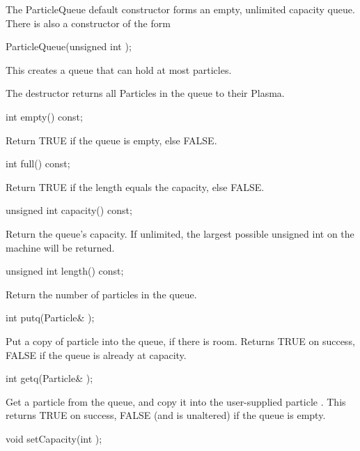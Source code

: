 The ParticleQueue default constructor forms an empty, unlimited capacity
queue.  There is also a constructor of the form

\begin{example}
ParticleQueue(unsigned int );
\end{example}

This creates a queue that can hold at most  particles.

The destructor returns all Particles in the queue to their Plasma.

\begin{example}
int empty() const;
\end{example}

Return TRUE if the queue is empty, else FALSE.

\begin{example}
int full() const;
\end{example}

Return TRUE if the length equals the capacity, else FALSE.

\begin{example}
unsigned int capacity() const;
\end{example}

Return the queue's capacity.  If unlimited, the largest possible
unsigned int on the machine will be returned.

\begin{example}
unsigned int length() const;
\end{example}

Return the number of particles in the queue.

\begin{example}
int putq(Particle& );
\end{example}

Put a copy of particle  into the queue, if there is room.
Returns TRUE on success, FALSE if the queue is already at capacity.

\begin{example}
int getq(Particle& );
\end{example}

Get a particle from the queue, and copy it into the user-supplied
particle .  This returns TRUE on success, FALSE (and 
is unaltered) if the queue is empty.

\begin{example}
void setCapacity(int );
\end{example}


